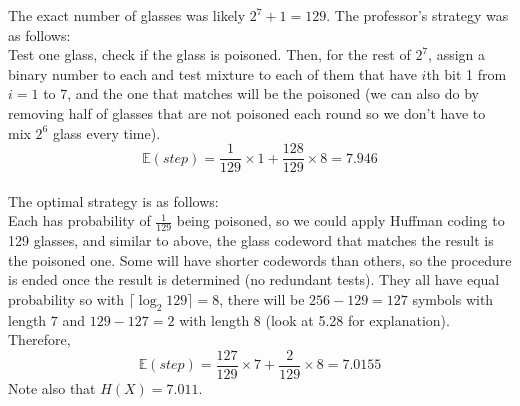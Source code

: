 \documentclass[12pt, a4paper]{article}
\begin{document}
\begin{sol}
The exact number of glasses was likely $2^7 + 1 = 129$. The professor's strategy was as follows: \\
Test one glass, check if the glass is poisoned. Then, for the rest of $2^7$, assign a binary number to each and test mixture to each of them that have $i$th bit 1 from $i = 1$ to $7$, and the one that matches will be the poisoned
(we can also do by removing half of glasses that are not poisoned each round so we don't have to mix $2^6$ glass every time). 
$$\mathbb{E}(step) = \frac{1}{129} \times 1 + \frac{128}{129} \times 8 = 7.946$$ \\

The optimal strategy is as follows: \\
Each has probability of $\frac{1}{129}$ being poisoned, so we could apply Huffman coding to 129 glasses, and similar to above, the glass codeword that matches the result is the poisoned one. Some will have shorter codewords than others, so the procedure is ended once the result is determined (no redundant tests).
They all have equal probability so with $\lceil \log_2 129 \rceil = 8$, there will be $256 - 129 = 127$ symbols with length $7$ and $129 - 127 = 2$ with length $8$ (look at 5.28 for explanation). Therefore,
$$\mathbb{E}(step) = \frac{127}{129} \times 7 + \frac{2}{129} \times 8 = 7.0155$$
Note also that $H(X) = 7.011$.
\end{sol}
\bigskip
\end{document}
